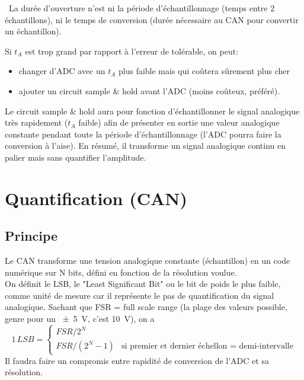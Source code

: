 \danger\, La durée d'ouverture n'est ni la période d'échantillonnage (temps entre 2 échantillons), ni le temps de conversion (durée nécessaire au CAN pour convertir un échantillon).\bigbreak

Si \(t_A\) est trop grand par rapport à l'erreur de tolérable, on peut:
\begin{itemize}
	\item changer d'ADC avec un \(t_A\) plus faible mais qui coûtera sûrement plus cher
	\item ajouter un circuit sample \& hold avant l'ADC (moins coûteux, préféré).
\end{itemize}
Le circuit sample \& hold aura pour fonction d'échantillonner le signal analogique très rapidement (\(t_A\) faible) afin de présenter en sortie une valeur analogique constante pendant toute la période d'échantillonnage (l'ADC pourra faire la conversion à l'aise). En résumé, il transforme un signal analogique continu en palier mais sans quantifier l'amplitude.
\section{Quantification (CAN)}
\subsection{Principe}
Le CAN transforme une tension analogique constante (échantillon) en un code numérique sur N bits, défini en fonction de la résolution voulue.\\
On définit le LSB, le "Least Significant Bit" ou le bit de poids le plus faible, comme unité de mesure car il représente le pas de quantification du signal analogique. Sachant que FSR = full scale range (la plage des valeurs possible, genre pour un \SI{+-5}{\volt}, c'est \SI{10}{\volt}), on a
\[1\,LSB = \left\{\begin{array}{lc}
FSR/2^{N}\\
FSR/(2^N-1) & \text{si premier et dernier échellon = demi-intervalle}
\end{array}\right.\]
Il faudra faire un compromis entre rapidité de conversion de l'ADC et sa résolution.
